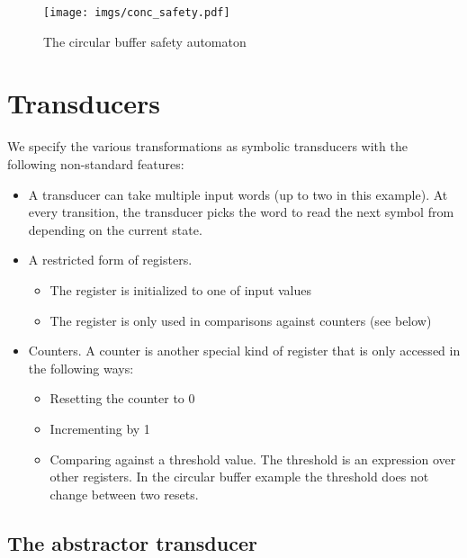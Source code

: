\documentclass{article}
\begin{document}
\begin{figure}[t]
    \center
    \texttt{[image: imgs/conc\_safety.pdf]}
    \caption{The circular buffer safety 
    automaton}\label{f:conc_safety}
\end{figure}



\section{Transducers}

We specify the various transformations as symbolic transducers 
with the following non-standard features:

\begin{itemize}
    \item A transducer can take multiple input words (up to two in 
        this example).  At every transition, the transducer picks 
        the word to read the next symbol from depending on the 
        current state.  

    \item A restricted form of registers.
        \begin{itemize}
            \item The register is initialized to one of input 
                values
            \item The register is only used in comparisons against 
                counters (see below)
        \end{itemize}

    \item Counters.  A counter is another special kind of register 
        that is only accessed in the following ways:
        \begin{itemize}
            \item Resetting the counter to 0
            \item Incrementing by 1
            \item Comparing against a threshold value.  The 
                threshold is an expression over other registers.  
                In the circular buffer example the threshold does 
                not change between two resets.
        \end{itemize}
\end{itemize}

\subsection{The abstractor transducer}
\end{document}
